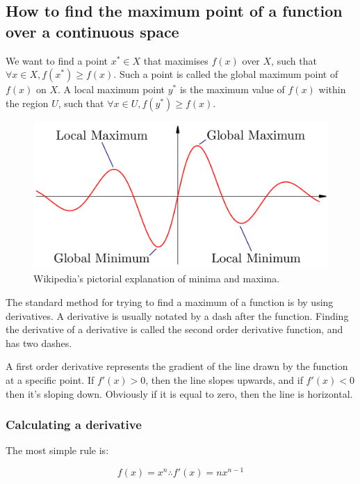 \subsection{How to find the maximum point of a function over a continuous space}

We want to find a point $x^* \in X$ that maximises $f(x)$ over $X$, such that
$\forall x \in X, f(x^*) \geq f(x)$. Such a point is called the global maximum
point of $f(x)$ on $X$. A local maximum point $y^*$ is the maximum value of
$f(x)$ within the region $U$, such that $\forall x \in U, f(y^*) \geq f(x)$.

\begin{figure}
  \centering
  \includegraphics[width=\textwidth]{images/maxima}
  \caption{Wikipedia's pictorial explanation of minima and maxima.}
  \label{fig:maxima}
\end{figure}

The standard method for trying to find a maximum of a function is by using
derivatives. A derivative is usually notated by a dash after the function.
Finding the derivative of a derivative is called the second order derivative
function, and has two dashes.

A first order derivative represents the gradient of the line drawn by the
function at a specific point. If $f'(x) > 0$, then the line slopes upwards, and
if $f'(x) < 0$ then it's sloping down. Obviously if it is equal to zero, then
the line is horizontal.


\subsubsection{Calculating a derivative}

The most simple rule is: 

\[
  f(x) = x^n \therefore f'(x) = nx^{n-1}
\]

